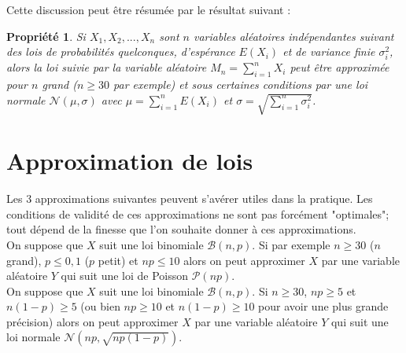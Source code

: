 \documentclass[12pt, a4paper]{book}
\newtheorem{prop}[thm]{Propriété}
\numberwithin{equation}{section}
\begin{document}
Cette discussion peut être résumée par le résultat suivant :
\begin{prop}
Si $X_1, X_2, ..., X_n$ sont $n$ variables aléatoires indépendantes suivant des lois de probabilités
quelconques, d'espérance $E(X_i)$ et de variance finie $\sigma_i^2$, alors la loi suivie par la variable
aléatoire $M_n=\sum_{i=1}^n X_i$ peut être approximée pour $n$ grand ($n\geq 30$ par exemple) et sous certaines conditions par
une loi normale $\mathcal{N}(\mu,\sigma)$ avec $\mu = \sum_{i=1}^n E(X_i)$ et
$\sigma = \sqrt{\sum_{i=1}^n \sigma_i^2}$. 
\end{prop}

%


\section{Approximation de lois} 

Les 3 approximations suivantes peuvent s'avérer utiles dans la pratique.
Les conditions de validité de ces approximations ne sont pas forcément "optimales"; tout dépend de la
finesse que l'on souhaite donner à ces approximations.\\

 On suppose que $X$ suit une loi
binomiale $\mathcal{B}(n,p)$. Si par exemple $n\geq 30$ ($n$ grand), $p\leq 0,1$ ($p$ petit) et $np\leq 10$
alors on peut approximer
$X$ par une variable aléatoire $Y$ qui suit une loi de Poisson $\mathcal{P}(np)$.\\

 On suppose que $X$ suit une loi binomiale
$\mathcal{B}(n,p)$. Si $n\geq 30$, $np\geq 5$ et $n(1-p)\geq 5$
(ou bien $np\geq 10$ et $n(1-p)\geq 10$ pour avoir une plus grande
précision) alors on peut approximer $X$
par une variable aléatoire $Y$ qui suit une loi normale $\mathcal{N}(np, \sqrt{np(1-p)})$.\\
\end{document}
